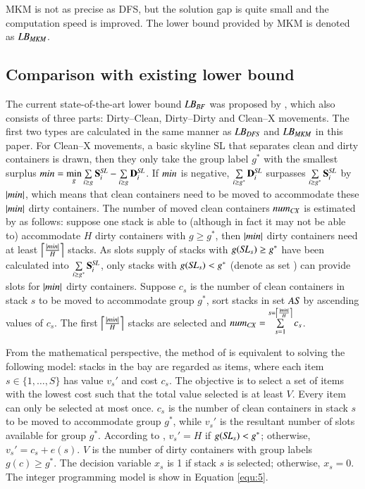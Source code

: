 \documentclass[review,3p,times,authoryear,12pt]{elsarticle}
\begin{document}
MKM is not as precise as DFS, but the solution gap is quite small and the computation speed is improved. The lower bound provided by MKM is denoted as $\id{LB}_{\id{MKM}}$.

\subsection{Comparison with existing lower bound}
The current state-of-the-art lower bound $\id{LB}_\id{BF}$ was proposed by \cite{BF2012}, which also consists of three parts: Dirty--Clean, Dirty--Dirty and Clean--X movements.
The first two types are calculated in the same manner as $\id{LB}_\id{DFS}$ and $\id{LB}_\id{MKM}$ in this paper. For Clean--X movements, a basic skyline SL that separates clean and dirty containers is drawn, then they only take the group label $g^*$ with the smallest surplus $\id{min}=\min\limits_g\sum\limits_{i\ge g}\mathbf S^\id{SL}_i-\sum\limits_{i\ge g}\mathbf D^\id{SL}_i$. If $\id{min}$ is negative, $\sum\limits_{i\ge g^*}\mathbf D^\id{SL}_i$ surpasses $\sum\limits_{i\ge g^*}\mathbf S^\id{SL}_i$ by $|\id{min}|$, which means that clean containers need to be moved to accommodate these $|\id{min}|$ dirty containers. The number of moved clean containers $\id{num}_\id{CX}$ is estimated by \cite{BF2012} as follows: suppose one stack is able to (although in fact it may not be able to) accommodate $H$ dirty containers with $g\ge g^*$, then $|\id{min}|$ dirty containers need at least $\left\lceil\frac{|\id{min}|}{H}\right\rceil$ stacks. As slots supply of stacks with $g(\id{SL}_s)\ge g^*$ have been calculated into $\sum\limits_{i\ge g^*}\mathbf S^\id{SL}_i$, only stacks with $g(\id{SL}_s)< g^*$ (denote as set ) can provide slots for $|\id{min}|$ dirty containers. Suppose $c_s$ is the number of clean containers in stack $s$ to be moved to accommodate group $g^*$, sort stacks in set $\id{AS}$ by ascending values of $c_s$. The first $\left\lceil\frac{|\id{min}|}{H}\right\rceil$ stacks are selected and $\id{num}_\id{CX}=\sum\limits_{s=1}^{s=\left\lceil\frac{|\id{min}|}{H}\right\rceil}c_s$.

From the mathematical perspective, the method of \cite{BF2012} is equivalent to solving the following model: stacks in the bay are regarded as items, where each item $s\in\{1,\dots,S\}$ has value $v_s'$ and cost $c_s$. The objective is to select a set of items with the lowest cost such that the total value selected is at least $V$. Every item can only be selected at most once. $c_s$ is the number of clean containers in stack $s$ to be moved to accommodate group $g^*$, while $v_s'$ is the resultant number of slots available for group $g^*$. According to \cite{BF2012}, $v_s'=H$ if $g(\id{SL}_s)<g^*$; otherwise, $v_s'=c_s+e(s)$. $V$ is the number of dirty containers with group labels $g(c)\ge g^*$. The decision variable $x_s$ is 1 if stack $s$ is selected; otherwise, $x_s=0$. The integer programming model is show in Equation \ref{equ:5}.
\end{document}
